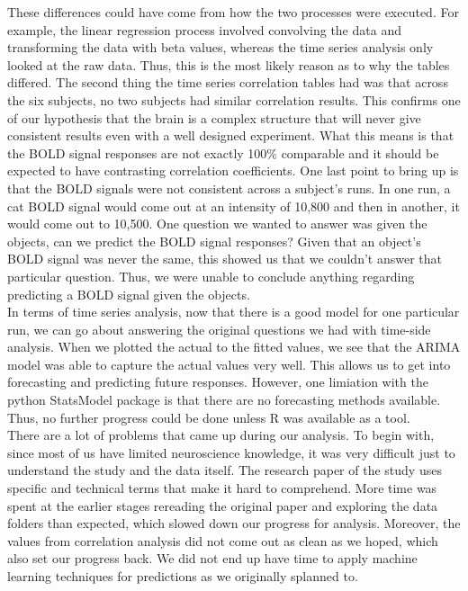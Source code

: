 \documentclass[11pt,twocolumn]{article}
\begin{document}
These differences could have come from how
the two processes were executed. For example, the linear regression process
involved convolving the data and transforming the data with beta values, 
whereas the time series analysis only looked at the raw data. Thus, this is
the most likely reason as to why the tables differed. The second thing the time
series correlation tables had was that across the six subjects, no two subjects
had similar correlation results. This confirms one of our hypothesis that 
the brain is a complex structure that will never give consistent results even
with a well designed experiment. What this means is that the BOLD signal
responses are not exactly 100\% comparable and it should be expected to have
contrasting correlation coefficients. One last point to bring up is that
the BOLD signals were not consistent across a subject's runs. In one run, a
cat BOLD signal would come out at an intensity of 10,800 and then in another,
it would come out to 10,500. One question we wanted to answer was given the
objects, can we predict the BOLD signal responses? Given that an object's
BOLD signal was never the same, this showed us that we couldn't answer that
particular question. Thus, we were unable to conclude anything regarding
predicting a BOLD signal given the objects. \\

In terms of time series analysis, now that there is a good model 
for one particular run, we can go about
answering the original questions we had with time-side analysis. When we 
plotted the actual to the fitted values, we see that the ARIMA model was 
able to capture the actual values very well. This allows us to get into
forecasting and predicting future responses. However, one limiation with
the python StatsModel package is that there are no forecasting methods
available. Thus, no further progress could be done unless R was available
as a tool. \\

There are a lot of problems that came up during our analysis. To begin with, 
since most of us have limited neuroscience knowledge, it was very difficult 
just to understand the study and the data itself. The research paper of the 
study uses specific and technical terms that make it hard to comprehend. 
More time was spent at the earlier stages rereading the 
original paper and exploring the data folders than expected, which slowed down 
our progress for analysis. Moreover, the values from correlation analysis 
did not come out as clean as we hoped, which also set our progress back. 
We did not end up have time to apply machine learning techniques for 
predictions as we originally splanned to. \\






\end{document}
